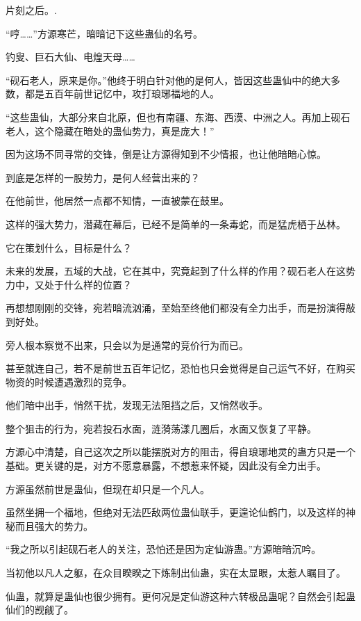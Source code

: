 
\begin{this_body}

片刻之后。.

“哼……”方源寒芒，暗暗记下这些蛊仙的名号。

钓叟、巨石大仙、电煌天母……

“砚石老人，原来是你。”他终于明白针对他的是何人，皆因这些蛊仙中的绝大多数，都是五百年前世记忆中，攻打琅琊福地的人。

“这些蛊仙，大部分来自北原，但也有南疆、东海、西漠、中洲之人。再加上砚石老人，这个隐藏在暗处的蛊仙势力，真是庞大！”

因为这场不同寻常的交锋，倒是让方源得知到不少情报，也让他暗暗心惊。

到底是怎样的一股势力，是何人经营出来的？

在他前世，他居然一点都不知情，一直被蒙在鼓里。

这样的强大势力，潜藏在幕后，已经不是简单的一条毒蛇，而是猛虎栖于丛林。

它在策划什么，目标是什么？

未来的发展，五域的大战，它在其中，究竟起到了什么样的作用？砚石老人在这势力中，又处于什么样的位置？

再想想刚刚的交锋，宛若暗流汹涌，至始至终他们都没有全力出手，而是扮演得敲到好处。

旁人根本察觉不出来，只会以为是通常的竞价行为而已。

甚至就连自己，若不是前世五百年记忆，恐怕也只会觉得是自己运气不好，在购买物资的时候遭遇激烈的竞争。

他们暗中出手，悄然干扰，发现无法阻挡之后，又悄然收手。

整个狙击的行为，宛若投石水面，涟漪荡漾几圈后，水面又恢复了平静。

方源心中清楚，自己这次之所以能摆脱对方的阻击，得自琅琊地灵的蛊方只是一个基础。更关键的是，对方不愿意暴露，不想惹来怀疑，因此没有全力出手。

方源虽然前世是蛊仙，但现在却只是一个凡人。

虽然坐拥一个福地，但绝对无法匹敌两位蛊仙联手，更遑论仙鹤门，以及这样的神秘而且强大的势力。

“我之所以引起砚石老人的关注，恐怕还是因为定仙游蛊。”方源暗暗沉吟。

当初他以凡人之躯，在众目睽睽之下炼制出仙蛊，实在太显眼，太惹人瞩目了。

仙蛊，就算是蛊仙也很少拥有。更何况是定仙游这种六转极品蛊呢？自然会引起蛊仙们的觊觎了。


\end{this_body}
